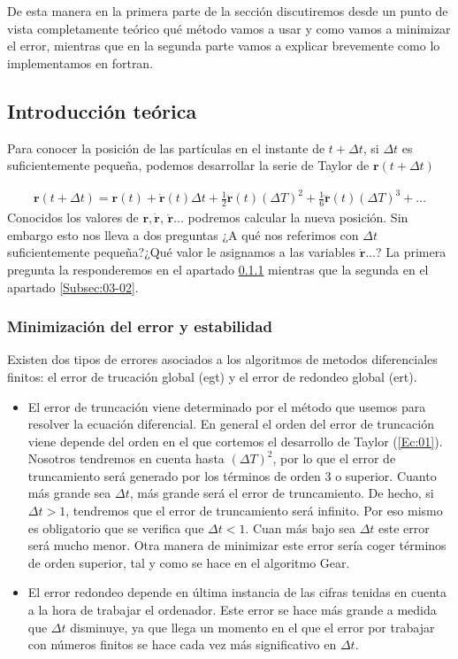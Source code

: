 \documentclass[11pt]{article} %
\newcommand{\rn}{\mathbf{r}}
\begin{document}
De esta manera en la primera parte de la sección discutiremos desde un punto de vista completamente teórico qué método vamos a usar y como vamos a minimizar el error, mientras que en la segunda parte vamos a explicar brevemente como lo implementamos en fortran.

\subsection{Introducción teórica}

Para conocer la posición de las partículas en el instante de $t + \Delta t$, si $\Delta t$ es suficientemente pequeña, podemos desarrollar la serie de Taylor de $\rn(t+\Delta t)$

\begin{eqnarray}
	\rn(t+\Delta t) = \rn (t) + \dot{\rn} (t) \Delta t + \frac{1}{2} \ddot{\rn} (t) (\Delta T)^2 + \frac{1}{6} \dddot{\rn} (t) (\Delta T)^3 + \ldots \label{Ec:01}
\end{eqnarray}
Conocidos los valores de $\rn,\dot{\rn}$, $\ddot{\rn}...$ podremos calcular la nueva posición. Sin embargo esto nos lleva a dos preguntas ¿A qué nos referimos con $\Delta t$ suficientemente pequeña?¿Qué valor le asignamos a las variables $\dot{\rn}...$? La primera pregunta la responderemos en el apartado \ref{Subsec:03-01} mientras que la segunda en el apartado \ref{Subsec:03-02}. 


\subsubsection{Minimización del error y estabilidad} \label{Subsec:03-01}

Existen dos tipos de errores asociados a los algoritmos de metodos diferenciales finitos: el error de trucación global (egt) y el error de redondeo global (ert).

\begin{itemize}
 \item El error de truncación viene determinado por el método que usemos para resolver la ecuación diferencial. En general el orden del error de truncación viene depende del orden en el que cortemos el desarrollo de Taylor (\ref{Ec:01}). Nosotros tendremos en cuenta hasta $(\Delta T)^2$, por lo que el error de truncamiento será generado por los términos de orden 3 o superior. Cuanto más grande sea $\Delta t$, más grande será el error de truncamiento. De hecho, si $\Delta t>1$, tendremos que el error de truncamiento será infinito. Por eso mismo es obligatorio que se verifica que $\Delta t<1$. Cuan más bajo sea $\Delta t$ este error será mucho menor. Otra manera de minimizar este error sería coger términos de orden superior, tal y como se hace en el algoritmo Gear. 

 \item El error redondeo depende en última instancia de las cifras tenidas en cuenta a la hora de trabajar el ordenador. Este error se hace más grande a medida que $\Delta t$ disminuye, ya que llega un momento en el que el error por trabajar con números finitos se hace cada vez más significativo en $\Delta t$.  
\end{itemize}
\end{document}
